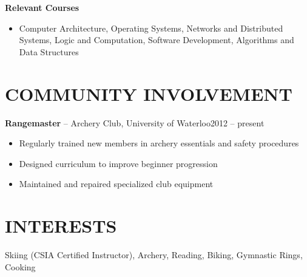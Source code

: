 \documentclass{res}
\begin{document}
\begin{resume}
    {\bf Relevant Courses}
      \vspace{1mm}
      \begin{itemize}
       \item Computer Architecture, Operating Systems, Networks and Distributed Systems, Logic and Computation, Software Development, Algorithms and Data Structures
      \end{itemize}
    
    
\section{COMMUNITY INVOLVEMENT}
    \vspace{3mm}
    {\bf Rangemaster} -- Archery Club, University of Waterloo\hfill 2012 -- present\\
    \vspace{-2mm}
   \begin{itemize}
    \item Regularly trained new members in archery essentials and safety procedures
    \item Designed curriculum to improve beginner progression
    \item Maintained and repaired specialized club equipment
   \end{itemize}
   

\section{INTERESTS}
  \vspace{3mm}
  Skiing (CSIA Certified Instructor), Archery, Reading, Biking, Gymnastic Rings, Cooking
  
 
\end{resume}
\end{document}
